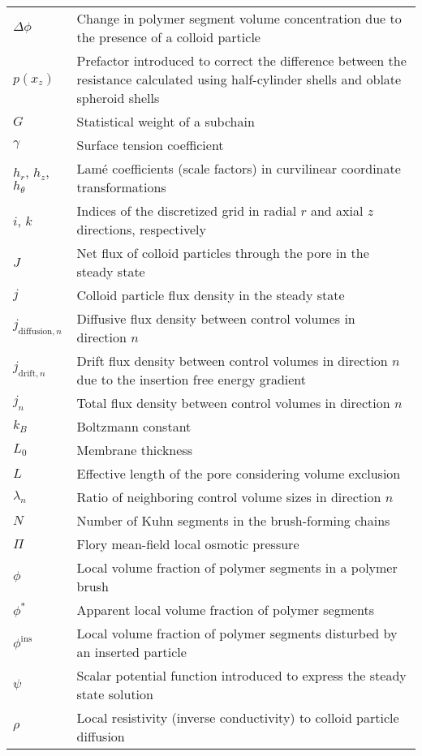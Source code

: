 \documentclass[10pt, a4paper]{article}
\begin{document}
\begin{tabularx}{\linewidth}{l X}
    $\Delta \phi$ & Change in polymer segment volume concentration due to the presence of a colloid particle \\
    $p(x_z)$ & Prefactor introduced to correct the difference between the resistance calculated using half-cylinder shells and oblate spheroid shells \\
    $G$ & Statistical weight of a subchain \\
    $\gamma$ & Surface tension coefficient \\
    $h_{r}$, $h_{z}$, $h_{\theta}$ & Lam\'e coefficients (scale factors) in curvilinear coordinate transformations \\
    $i$, $k$ & Indices of the discretized grid in radial $r$ and axial $z$ directions, respectively \\
    $J$ & Net flux of colloid particles through the pore in the steady state \\
    $j$ & Colloid particle flux density in the steady state \\
    $j_{\text{diffusion}, n}$ & Diffusive flux density between control volumes in direction $n$ \\
    $j_{\text{drift}, n}$ & Drift flux density between control volumes in direction $n$ due to the insertion free energy gradient \\
    $j_{n}$ & Total flux density between control volumes in direction $n$ \\
    $k_B$ & Boltzmann constant \\
    $L_{0}$ & Membrane thickness \\
    $L$ & Effective length of the pore considering volume exclusion \\
    $\lambda_{n}$ & Ratio of neighboring control volume sizes in direction $n$ \\
    $N$ & Number of Kuhn segments in the brush-forming chains \\
    $\Pi$ & Flory mean-field local osmotic pressure \\
    $\phi$ & Local volume fraction of polymer segments in a polymer brush \\
    $\phi^{\ast}$ & Apparent local volume fraction of polymer segments \\
    $\phi^{\text{ins}}$ & Local volume fraction of polymer segments disturbed by an inserted particle \\
    $\psi$ & Scalar potential function introduced to express the steady state solution \\
    $\rho$ & Local resistivity (inverse conductivity) to colloid particle diffusion \\

\end{tabularx}
\end{document}
